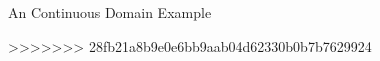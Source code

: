 \documentclass{beamer}
\begin{document}
\begin{frame}{An Continuous Domain Example}
\end{frame}
>>>>>>> 28fb21a8b9e0e6bb9aab04d62330b0b7b7629924
\end{document}
